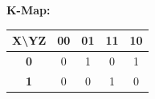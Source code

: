 \documentclass[11pt]{article}
\begin{document}
\begin{enumerate}
\begin{center}
        \textbf{K-Map:}\\[0.15in]
        \begin{tabular}{c | c | c | c | c |}
            \textbf{X\textbackslash YZ} & \textbf{00} & \textbf{01} & \textbf{11} & \textbf{10}\\
            \hline
            \textbf{0} & 0 & 1 & 0 & 1\\
            \hline
            \textbf{1} & 0 & 0 & 1 & 0\\
            \hline
        \end{tabular}\\[0.25in]
        
        \\[0.25in]
        
    \end{center}
\end{enumerate}
\end{document}
